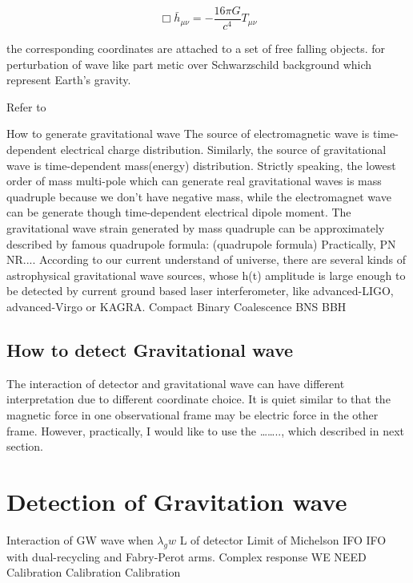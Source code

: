 \begin{equation}
    \Box \bar{h}_{\mu\nu} = - \frac{16\pi G}{c^4}T_{\mu\nu}
\end{equation}




the corresponding coordinates are attached to a set of free falling objects. 
for perturbation of wave like part metic over Schwarzschild background which represent Earth’s gravity.


Refer to \cite{maggiore:gw1}



How to generate gravitational wave
The source of electromagnetic wave is time-dependent electrical charge distribution.  Similarly, the source of gravitational wave is time-dependent mass(energy) distribution. Strictly speaking, the lowest order of mass multi-pole which can generate real gravitational waves is mass quadruple because we don’t have negative mass, while the electromagnet wave can be generate though time-dependent electrical dipole moment. The gravitational wave strain generated by mass quadruple can be approximately described by famous quadrupole formula:
(quadrupole formula)
Practically, PN NR....
According to our current understand of universe, there are several kinds of astrophysical gravitational wave sources, whose h(t) amplitude is large enough to be detected by current ground based laser interferometer, like advanced-LIGO, advanced-Virgo or KAGRA. 
Compact Binary Coalescence 
BNS BBH
\subsection{How to detect Gravitational wave}
The interaction of detector and gravitational wave can have different interpretation due to different coordinate choice\cite{ifo:gauge}. It is quiet similar to that the magnetic force in one observational frame may be electric force in the other frame. However, practically, I would like to use the …….., which described in next section.


\section{Detection of Gravitation wave}

Interaction of GW wave when $\lambda_gw$ L of detector
Limit of Michelson IFO
IFO with dual-recycling and Fabry-Perot  arms.
 Complex response
WE NEED Calibration Calibration Calibration



